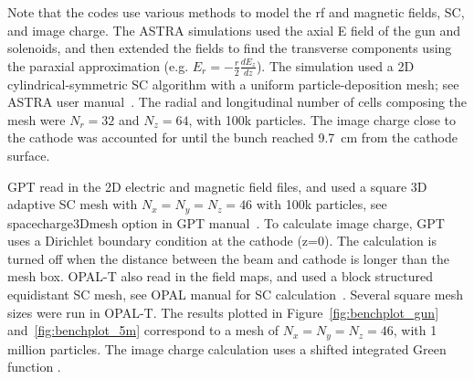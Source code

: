 Note that the codes use various methods to model 
the rf and magnetic fields, SC, and image charge. 
The ASTRA simulations used the axial E field of the  
gun and solenoids, and then extended the fields to find the
transverse components using the paraxial approximation 
(e.g. $E_r=-\frac{r}{2}\frac{dE_z}{dz}$). 
The simulation used a 2D cylindrical-symmetric SC algorithm with a uniform  
particle-deposition mesh; see ASTRA user manual~\cite{astra}.
The radial and longitudinal number of cells composing the mesh 
were $N_r=32$ and $N_z=64$, with 100k particles.  
The image charge close to the cathode was accounted for until 
the bunch reached \SI{9.7}{cm} from the cathode surface. 

GPT read in the 2D electric and magnetic field files,  
and used a square 3D adaptive SC mesh with $N_x=N_y=N_z=46$
with 100k particles, see spacecharge3Dmesh option in GPT manual~\cite{gpt}.
To calculate image charge, GPT uses a Dirichlet boundary condition at the  
cathode (z=0). The calculation is turned off when the  
distance between the beam and cathode is longer than the 
mesh box. OPAL-T also read in the field maps, and used a block 
structured equidistant SC mesh, see OPAL manual for SC calculation~\cite{opal}.  
Several square mesh sizes were run in OPAL-T. The results plotted in 
Figure~\ref{fig:benchplot_gun} and~\ref{fig:benchplot_5m} correspond to a mesh of $N_x=N_y=N_z=46$, with 1 million particles. 
The image charge calculation uses a 
shifted integrated Green function \cite{imagecharge}.  
